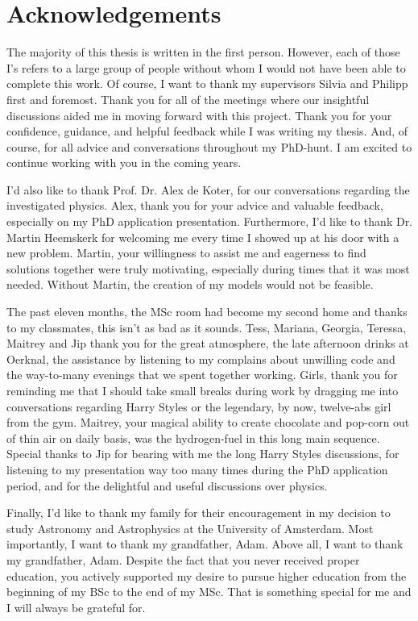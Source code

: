 \chapter*{Acknowledgements}

The majority of this thesis is written in the first person. However, each of those I's refers to a large group of people without whom I would not have been able to complete this work. Of course, I want to thank my supervisors Silvia and Philipp first and foremost. Thank you for all of the meetings where our insightful discussions aided me in moving forward with this project. Thank you for your confidence, guidance, and helpful feedback while I was writing my thesis. And, of course, for all advice and conversations throughout my PhD-hunt. I am excited to continue working with you in the coming years.

I'd also like to thank Prof. Dr. Alex de Koter, for our conversations regarding the investigated physics. Alex, thank you for your advice and valuable feedback, especially on my PhD application presentation. Furthermore, I'd like to thank Dr. Martin Heemskerk for welcoming me every time I showed up at his door with a new problem. Martin, your willingness to assist me and eagerness to find solutions together were truly motivating, especially during times that it was most needed. Without Martin, the creation of my models would not be feasible.

The past eleven months, the MSc room had become my second home and thanks to my classmates, this isn't as bad as it sounds. Tess, Mariana, Georgia, Teressa, Maitrey and Jip thank you for the great 
atmosphere, the late afternoon drinks at Oerknal, the assistance by listening to my complains about unwilling code and the way-to-many evenings that we spent together working. Girls, thank you for reminding me that I should take small breaks during work by dragging me into conversations regarding Harry Styles or the legendary, by now, twelve-abs girl from the gym. Maitrey, your magical ability to create chocolate and pop-corn out of thin air on daily basis, was the hydrogen-fuel in this long main sequence. Special thanks to Jip for bearing with me the long Harry Styles discussions, for listening to my presentation way too many times during the PhD application period, and for the delightful and useful discussions over physics. 

Finally, I'd like to thank my family for their encouragement in my decision to study Astronomy and Astrophysics at the University of Amsterdam. Most importantly, I want to thank my grandfather, Adam.  Above all, I want to thank my grandfather, Adam. Despite the fact that you never received proper education, you actively supported my desire to pursue higher education from the beginning of my BSc to the end of my MSc. That is something special for me and I will always be grateful for.
